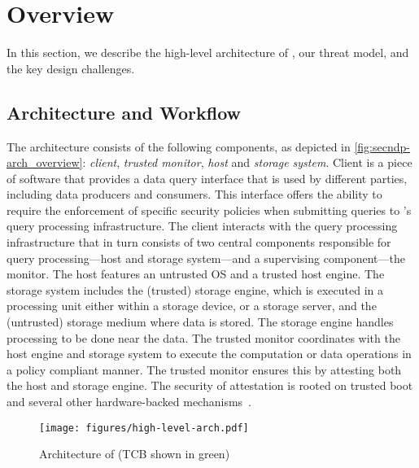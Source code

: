 \section{Overview}
\label{sec:overview}

In this section, we describe the high-level architecture of \project{}, our threat model, and the key design challenges.

\subsection{Architecture and Workflow}
\label{sec:arch}
The \project{} architecture consists of the following components, as depicted in \autoref{fig:secndp-arch_overview}: \textit{client}, \textit{trusted monitor}, \textit{host} and \textit{storage system}. 
Client is a piece of software that provides a data query interface that is used by different parties, including data producers and consumers. This interface offers the ability to require the enforcement of specific security policies when submitting queries to \project{}'s query processing infrastructure. The client interacts with the query processing infrastructure that in turn consists of two central components responsible for query processing---host and storage system---and a supervising component---the monitor. The host features an untrusted OS and a trusted host engine. The storage system includes the (trusted) storage engine, which is executed in a processing unit either within a storage device, or a storage server, and the (untrusted) storage medium where data is stored. The storage engine handles processing to be done near the data.
The trusted monitor %
coordinates with the host engine and storage system to execute the computation or data operations in a policy compliant manner. The trusted monitor ensures this by attesting both the host and storage engine. The security of attestation is rooted on trusted boot and several other hardware-backed mechanisms~\cite{ananti-hasp-2013}.


\begin{figure}[t]
	\centering
	\texttt{[image: figures/high-level-arch.pdf]}
    \vspace{-1mm}
	\caption{\small Architecture of \project{} (TCB shown in green)}
	\label{fig:secndp-arch_overview} 
	\vspace{-2mm}
\end{figure}

